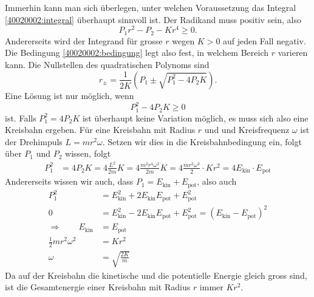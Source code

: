 \begin{diskussion}
Immerhin kann man sich überlegen, unter welchen Voraussetzung das
Integral
\eqref{40020002:integral}
überhaupt sinnvoll ist. Der Radikand muss positiv sein, also
\begin{equation}
P_1r^2-P_2-Kr^4\ge 0.
\label{40020002:bedingung}
\end{equation}
Andererseits wird der Integrand für grosse $r$ wegen $K>0$ auf
jeden Fall negativ.  Die Bedingung \eqref{40020002:bedingung}
legt also fest, in welchem Bereich $r$ varieren kann. Die Nullstellen
des quadratischen Polynoms sind
\[
r_\pm=\frac{1}{2K}\left(P_1\pm\sqrt{P_1^2-4P_2K}\right).
\]
Eine Lösung ist nur möglich, wenn
\[
P_1^2-4P_2K\ge 0
\]
ist.
Falls $P_1^2=4P_2K$ ist überhaupt keine Variation möglich, es muss
sich also eine Kreisbahn ergeben. Für eine Kreisbahn mit Radius $r$ 
und und Kreisfrequenz $\omega$ ist der Drehimpuls $L=mr^2\omega$.
Setzen wir dies in die Kreisbahnbedingung ein, folgt
über $P_1$ und $P_2$ wissen, folgt
\begin{align*}
P_1^2&=4P_2K
=
4\frac{L^2}{2m}K
=
4\frac{m^2r^4\omega^2}{2m}K
=
4 \frac{mr^2\omega^2}{2}  \cdot Kr^2
=
4 E_{\text{kin}}\cdot E_{\text{pot}}
\end{align*}
Andererseits wissen wir auch, dass $P_1=E_{\text{kin}}+E_{\text{pot}}$,
also auch
\begin{align*}
P_1^2&=
E_{\text{kin}}^2
+ 2 
E_{\text{kin}}
E_{\text{pot}}
+
E_{\text{pot}}^2
\\
0&=
E_{\text{kin}}^2
- 2 
E_{\text{kin}}
E_{\text{pot}}
+
E_{\text{pot}}^2
=
(E_{\text{kin}}
-
E_{\text{pot}})^2
\\
\Rightarrow\qquad
E_{\text{kin}}
&=
E_{\text{pot}}
\\
\frac12mr^2\omega^2&=Kr^2
\\
\omega&=\sqrt{\frac{2K}{m}}
\end{align*}
Da auf der Kreisbahn die kinetische und die potentielle Energie
gleich gross sind, ist die Gesamtenergie einer Kreisbahn mit Radius
$r$ immer $Kr^2$.
\end{diskussion}
